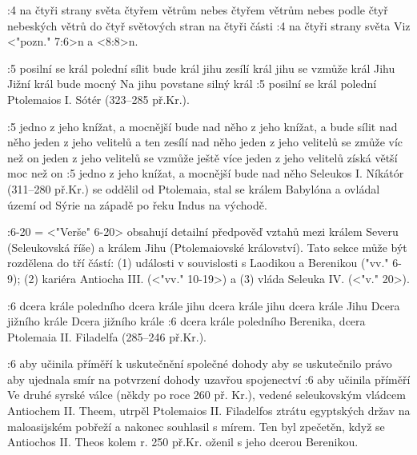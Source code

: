 :4  
    {na čtyři strany světa}   %
    {čtyřem větrům nebes}   %
    {čtyřem větrům nebes}   %
    {podle čtyř nebeských větrů}   %
    {do čtyř světových stran}   %
    {na čtyři části}   %
:4 {na čtyři strany světa}  Viz <"pozn." 7:6>n a <8:8>n. 

:5
    {posilní se král polední}   %
    {sílit bude král jihu}   %
    {zesílí král jihu}   %
    {se vzmůže král Jihu}   %
    {Jižní král bude mocný}   %
    {Na jihu povstane silný král}   %
:5 {posilní se král polední} Ptolemaios I. Sótér (323--285 př.Kr.).  
   
:5  
    {jedno z jeho knížat, a mocnější bude nad něho}   %
    {z jeho knížat, a bude sílit nad něho}   %
    {jeden z jeho velitelů a ten zesílí nad něho}   %
    {jeden z jeho velitelů se zmůže víc než on}   %
    {jeden z jeho velitelů se vzmůže ještě více}   %
    {jeden z jeho velitelů získá větší moc než on}   %
:5 {jedno z jeho knížat, a mocnější bude nad něho} 
    Seleukos I. Níkátór (311--280 př.Kr.) se oddělil od Ptolemaia, stal se králem Babylóna a ovládal území od Sýrie na západě po řeku Indus na východě.
   
:6-20 {}={}  <"Verše" 6-20> obsahují detailní předpověď vztahů mezi  králem Severu (Seleukovská říše) a králem Jihu (Ptolemaiovské království). Tato sekce může být rozdělena do tří částí: (1) události v souvislosti s Laodikou a Berenikou ("vv." 6-9); (2) kariéra Antiocha III. (<"vv." 10-19>) a (3) vláda Seleuka IV. (<"v." 20>).


:6
    {dcera krále poledního}   %
    {dcera krále jihu}   %
    {dcera krále jihu}   %
    {dcera krále Jihu}   %
    {Dcera jižního krále}   %
    {Dcera jižního krále}   %
:6 {dcera krále poledního}
    Berenika, dcera Ptolemaia II. Filadelfa (285--246 př.Kr.). 


:6
    {aby učinila příměří}   %
    {k uskutečnění společné dohody}   %
    {aby se uskutečnilo právo}   %
    {aby ujednala smír}   %
    {na potvrzení dohody}   %
    {uzavřou spojenectví}   %
:6 {aby učinila příměří}
    Ve druhé syrské válce (někdy po roce 260 př. Kr.), vedené seleukovským vládcem Antiochem II. Theem, utrpěl Ptolemaios II. Filadelfos ztrátu egyptských držav na maloasijském pobřeží a nakonec souhlasil s mírem. Ten byl zpečetěn, když se Antiochos II. Theos kolem r. 250 př.Kr. oženil s jeho dcerou Berenikou.

